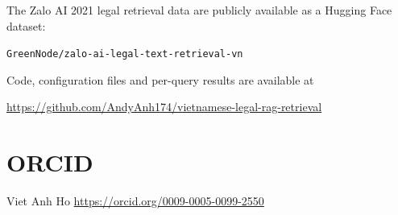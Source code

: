 \documentclass{ws-vjcs}
\begin{document}
The Zalo AI 2021 legal retrieval data are publicly available as a Hugging Face dataset:
\begin{center}\texttt{GreenNode/zalo-ai-legal-text-retrieval-vn}\end{center}
Code, configuration files and per-query results are available at
\begin{center}\url{https://github.com/AndyAnh174/vietnamese-legal-rag-retrieval}\end{center}

\section*{ORCID}

\noindent Viet Anh Ho \quad \url{https://orcid.org/0009-0005-0099-2550}



\end{document}

